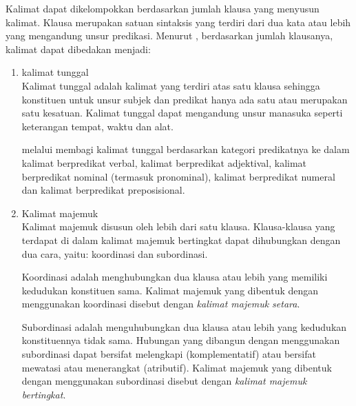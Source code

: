 Kalimat dapat dikelompokkan berdasarkan jumlah klausa yang menyusun kalimat. Klausa merupakan satuan sintaksis yang terdiri dari dua kata atau lebih yang mengandung unsur predikasi. Menurut \citet{alwi}, berdasarkan jumlah klausanya, kalimat dapat dibedakan menjadi:
\begin{enumerate}
	\item kalimat tunggal\\
	Kalimat tunggal adalah kalimat yang terdiri atas satu klausa sehingga konstituen untuk unsur subjek dan predikat hanya ada satu atau merupakan satu kesatuan. Kalimat tunggal dapat mengandung unsur manasuka seperti keterangan tempat, waktu dan alat.

	\citet{alwi} melalui \citet{suryawan} membagi kalimat tunggal berdasarkan kategori predikatnya ke dalam kalimat  berpredikat verbal, kalimat berpredikat adjektival, kalimat berpredikat nominal (termasuk pronominal), kalimat berpredikat numeral dan kalimat berpredikat preposisional.

	\item Kalimat majemuk\\
	Kalimat majemuk disusun oleh lebih dari satu klausa. Klausa-klausa yang terdapat di dalam kalimat majemuk bertingkat dapat dihubungkan dengan dua cara, yaitu: koordinasi dan subordinasi.

	Koordinasi adalah menghubungkan dua klausa atau lebih yang memiliki kedudukan konstituen sama. Kalimat majemuk yang dibentuk dengan menggunakan koordinasi disebut dengan \emph{kalimat majemuk setara}.

	Subordinasi adalah menguhubungkan dua klausa atau lebih yang kedudukan konstituennya tidak sama. Hubungan yang dibangun dengan menggunakan subordinasi dapat bersifat melengkapi (komplementatif) atau bersifat mewatasi atau menerangkat (atributif). Kalimat majemuk yang dibentuk dengan menggunakan subordinasi disebut dengan \emph{kalimat majemuk bertingkat}.
\end{enumerate}

